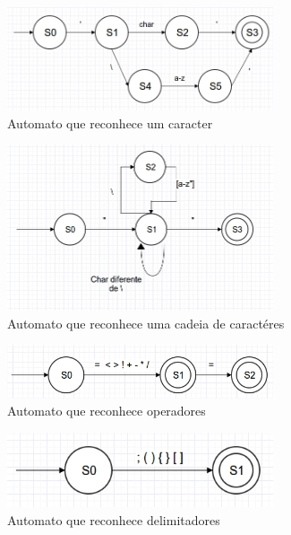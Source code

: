 \documentclass[
	article,			%
	11pt,				%
	oneside,			%
	a4paper,			%
	english,			%
	brazil,				%
	]{abntex2}
\begin{document}
\begin{figure}[H]
  \caption{Automato que reconhece um caracter}
  \centering
    \includegraphics[width=0.7\textwidth]{automatos/char}
\end{figure}

\begin{figure}[H]
  \caption{Automato que reconhece uma cadeia de caractéres}
  \centering
    \includegraphics[width=0.7\textwidth]{automatos/string}
\end{figure}

\begin{figure}[H]
  \caption{Automato que reconhece operadores}
  \centering
    \includegraphics[width=0.7\textwidth]{automatos/operators}
\end{figure}

\begin{figure}[H]
  \caption{Automato que reconhece delimitadores}
  \centering
    \includegraphics[width=0.7\textwidth]{automatos/delimiters}
\end{figure}
\end{document}
